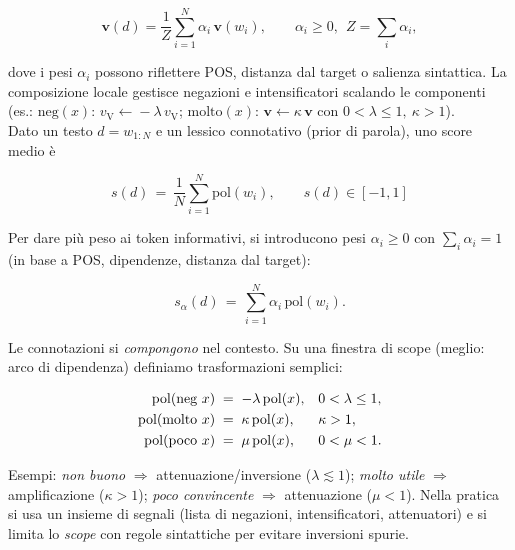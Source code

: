             $$
            \mathbf{v}(d)=\frac{1}{Z}\sum_{i=1}^{N}\alpha_i\,\mathbf{v}(w_i),\qquad \alpha_i\ge 0,\ \ Z=\sum_i \alpha_i,
            $$
            
            dove i pesi $\alpha_i$ possono riflettere POS, distanza dal target o salienza sintattica. La composizione locale gestisce negazioni e intensificatori scalando le componenti (es.: $\mathrm{neg}(x):\, v_{\text{V}}\!\leftarrow\!-\lambda\,v_{\text{V}}$; $\mathrm{molto}(x):\, \mathbf{v}\!\leftarrow\!\kappa\,\mathbf{v}$ con $0<\lambda\le1,\ \kappa>1$).\\
            
            \noindent Dato un testo $d=w_{1:N}$ e un lessico connotativo (prior di parola), uno score medio è

            $$
                s(d) \,=\, \frac{1}{N}\sum_{i=1}^{N} \mathrm{pol}(w_i),\qquad s(d)\in[-1,1]
            $$
            
            Per dare più peso ai token informativi, si introducono pesi $\alpha_i\ge 0$ con $\sum_i \alpha_i=1$ (in base a POS, dipendenze, distanza dal target):

            $$
                s_{\alpha}(d) \,=\, \sum_{i=1}^{N} \alpha_i\,\mathrm{pol}(w_i).
            $$
            
            Le connotazioni si \emph{compongono} nel contesto. Su una finestra di scope (meglio: arco di dipendenza) definiamo trasformazioni semplici:
            
            \begin{align}
                 \notag\mathrm{pol}(\text{neg }x) &\;=\; -\lambda\,\mathrm{pol}(x), && 0<\lambda\le 1,\\
                 \notag\mathrm{pol}(\text{molto }x) &\;=\; \kappa\,\mathrm{pol}(x), && \kappa>1,\\
                 \notag\mathrm{pol}(\text{poco }x) &\;=\; \mu\,\mathrm{pol}(x), && 0<\mu<1.
            \end{align}
            
            Esempi: \emph{non buono} $\Rightarrow$ attenuazione/inversione ($\lambda\lesssim 1$); \emph{molto utile} $\Rightarrow$ amplificazione ($\kappa>1$); \emph{poco convincente} $\Rightarrow$ attenuazione ($\mu<1$). Nella pratica si usa un insieme di segnali (lista di negazioni, intensificatori, attenuatori) e si limita lo \emph{scope} con regole sintattiche per evitare inversioni spurie.
    
    \newpage

